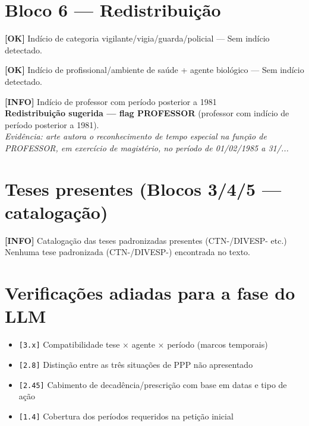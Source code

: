 \documentclass[12pt,a4paper]{article}
\newcommand{\statusOK}[1]{\textcolor{corOK}{\textbf{[OK]}} #1}
\newcommand{\statusINFO}[1]{\textcolor{corINFO}{\textbf{[INFO]}} #1}
\begin{document}
\section{Bloco 6 --- Redistribuição}

\statusOK{Indício de categoria vigilante/vigia/guarda/policial} --- Sem indício detectado.

\medskip
\statusOK{Indício de profissional/ambiente de saúde + agente biológico} --- Sem indício detectado.

\medskip
\statusINFO{Indício de professor com período posterior a 1981}\\
\textcolor{corVERIFICAR}{\textbf{Redistribuição sugerida --- flag PROFESSOR}} (professor com indício de período posterior a 1981).
\\
\textit{Evidência: arte autora o reconhecimento de tempo especial na função de PROFESSOR, em exercício de magistério, no período de 01/02/1985 a 31/...}

\section{Teses presentes (Blocos 3/4/5 --- catalogação)}

\statusINFO{Catalogação das teses padronizadas presentes (CTN-/DIVESP- etc.)}\\
Nenhuma tese padronizada (CTN-/DIVESP-) encontrada no texto.

\section{Verificações adiadas para a fase do LLM}

\begin{itemize}
  \item \texttt{[3.x]} Compatibilidade tese × agente × período (marcos temporais)
  \item \texttt{[2.8]} Distinção entre as três situações de PPP não apresentado
  \item \texttt{[2.45]} Cabimento de decadência/prescrição com base em datas e tipo de ação
  \item \texttt{[1.4]} Cobertura dos períodos requeridos na petição inicial
\end{itemize}
\end{document}
